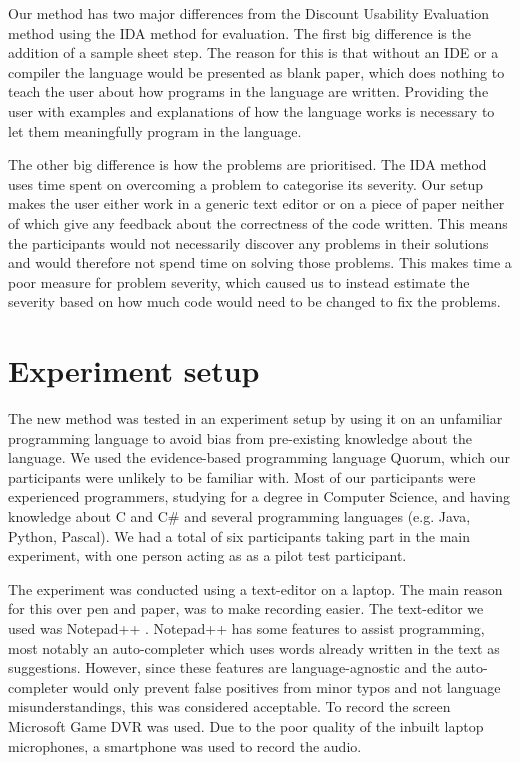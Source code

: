 \documentclass[preprint,10pt]{sigplanconf}
\begin{document}
Our method has two major differences from the Discount Usability Evaluation method using the IDA method for evaluation.
The first big difference is the addition of a sample sheet step. The reason for this is that without an IDE or a compiler the language would be presented as blank paper, which does nothing to teach the user about how programs in the language are written. Providing the user with examples and explanations of how the language works is necessary to let them meaningfully program in the language.

The other big difference is how the problems are prioritised. The IDA method uses time spent on overcoming a problem to categorise its severity. Our setup makes the user either work in a generic text editor or on a piece of paper neither of which give any feedback about the correctness of the code written. This means the participants would not necessarily discover any problems in their solutions and would therefore not spend time on solving those problems.
This makes time a poor measure for problem severity, which caused us to instead estimate the severity based on how much code would need to be changed to fix the problems.

\section{Experiment setup}
The new method was tested in an experiment setup by using it on an unfamiliar programming language to avoid bias from pre-existing knowledge about the language. 
We used the evidence-based programming language Quorum, which our participants were unlikely to be familiar with. Most of our participants were experienced programmers,  studying for a degree in Computer Science, and having knowledge about C and C\# and several programming languages (e.g. Java, Python, Pascal). We had a total of six participants taking part in the main experiment, with one person acting as as a pilot test participant.

The experiment was conducted using a text-editor on a laptop.
The main reason for this over pen and paper, was to make recording easier.
The text-editor we used was Notepad++ \cite{Notepad}.
Notepad++ has some features to assist programming, most notably an auto-completer which uses words already written in the text as suggestions.
However, since these features are language-agnostic and the auto-completer would only prevent false positives from minor typos and not language misunderstandings, this was considered acceptable.
To record the screen Microsoft Game DVR was used.
Due to the poor quality of the inbuilt laptop microphones, a smartphone was used to record the audio.
\end{document}
